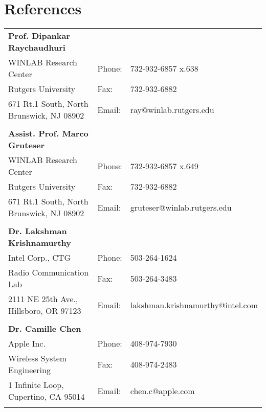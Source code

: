 \documentclass[10pt]{article}
\begin{document}
\section{References}
\begin{table}[h!]
\begin{tabular}{@{}lll@{}}
\textbf{Prof. Dipankar Raychaudhuri} \\
WINLAB Research Center & Phone: & 732-932-6857 x.638\\
Rutgers University & Fax: & 732-932-6882\\
671 Rt.1 South, North Brunswick, NJ 08902 & 
Email: & ray@winlab.rutgers.edu\\\\
\textbf{Assist. Prof. Marco Gruteser} \\
WINLAB Research Center & Phone: & 732-932-6857 x.649\\
Rutgers University & Fax: & 732-932-6882\\
671 Rt.1 South, North Brunswick, NJ 08902 & 
Email: & gruteser@winlab.rutgers.edu\\\\
\textbf{Dr. Lakshman Krishnamurthy} \\
Intel Corp., CTG & Phone: & 503-264-1624\\
Radio Communication Lab& Fax: & 503-264-3483\\
2111 NE 25th Ave., Hillsboro, OR 97123 & 
Email: & lakshman.krishnamurthy@intel.com\\\\
\textbf{Dr. Camille Chen} \\
Apple Inc. & Phone: & 408-974-7930\\
Wireless System Engineering& Fax: & 408-974-2483\\
1 Infinite Loop, Cupertino, CA 95014 & 
Email: & chen.c@apple.com\\\\

\end{tabular}
\end{table}


\end{document}

